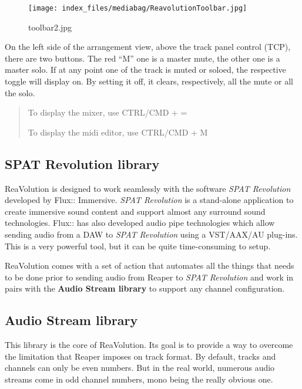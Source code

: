 \documentclass[
  letterpaper,
  DIV=11,
  numbers=noendperiod]{scrreport}
\begin{document}
\begin{figure}

{\centering \texttt{[image: index\_files/mediabag/ReavolutionToolbar.jpg]}

}

\caption{toolbar2.jpg}

\end{figure}

On the left side of the arrangement view, above the track panel control
(TCP), there are two buttons. The red ``M'' one is a master mute, the
other one is a master solo. If at any point one of the track is muted or
soloed, the respective toggle will display on. By setting it off, it
clears, respectively, all the mute or all the solo.

\begin{quote}
To display the mixer, use CTRL/CMD + =

To display the midi editor, use CTRL/CMD + M
\end{quote}

\hypertarget{spat-revolution-library}{%
\subsection{SPAT Revolution library}\label{spat-revolution-library}}

ReaVolution is designed to work seamlessly with the software \emph{SPAT
Revolution} developed by Flux:: Immersive. \emph{SPAT Revolution} is a
stand-alone application to create immersive sound content and support
almost any surround sound technologies. Flux:: has also developed audio
pipe technologies which allow sending audio from a DAW to \emph{SPAT
Revolution} using a VST/AAX/AU plug-ins. This is a very powerful tool,
but it can be quite time-consuming to setup.

ReaVolution comes with a set of action that automates all the things
that needs to be done prior to sending audio from Reaper to \emph{SPAT
Revolution} and work in pairs with the \textbf{Audio Stream library} to
support any channel configuration.

\hypertarget{audio-stream-library}{%
\subsection{Audio Stream library}\label{audio-stream-library}}

This library is the core of ReaVolution. Its goal is to provide a way to
overcome the limitation that Reaper imposes on track format. By default,
tracks and channels can only be even numbers. But in the real world,
numerous audio streams come in odd channel numbers, mono being the
really obvious one.
\end{document}
